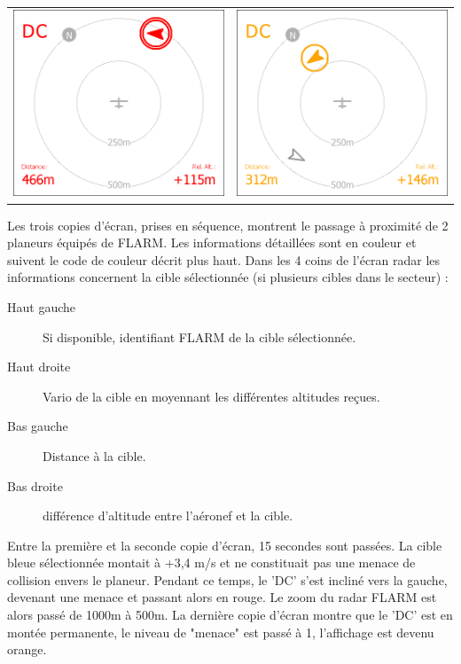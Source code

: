 \begin{center}
\begin{tabular}{c c}
\includegraphics[angle=0,width=0.5\linewidth,keepaspectratio='true']{figures/cut-flarm2.png}&
\includegraphics[angle=0,width=0.5\linewidth,keepaspectratio='true']{figures/cut-flarm3.png}\\
\end{tabular}
\end{center}
Les trois copies d'écran, prises en séquence, montrent le passage à proximité de 2 planeurs équipés de FLARM. Les informations détaillées sont en couleur et suivent le code de couleur décrit plus haut. 
Dans les 4 coins de l'écran radar les informations concernent la cible sélectionnée (si plusieurs cibles dans le secteur) :
\begin{description}
\item[Haut gauche]  Si disponible, identifiant FLARM de la cible sélectionnée.
\item[Haut droite]  Vario de la cible en moyennant les différentes altitudes reçues.
\item[Bas gauche]  Distance à la cible.
\item[Bas droite]  différence d'altitude entre l'aéronef et la cible. 
\end{description}

Entre la première et la seconde copie d'écran, 15 secondes sont passées. La cible bleue sélectionnée montait à +3,4 m/s et ne constituait pas une menace de collision envers le planeur. Pendant ce temps, le 'DC' s'est incliné vers la gauche, devenant une menace et passant alors en rouge. Le zoom du radar FLARM est alors passé de 1000m à 500m. La dernière copie d'écran montre que le 'DC' est en montée permanente, le niveau de "menace" est passé à 1, l'affichage est devenu orange.

